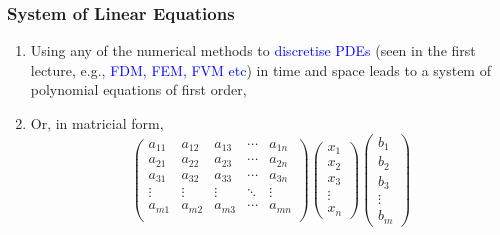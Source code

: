 \documentclass[10pt,compress,handout,ignorenonframetext]{beamer}
\begin{document}
\begin{frame}
 \frametitle{System of Linear Equations} 
\begin{enumerate}
  \item <1-> Using any of the numerical methods to \textcolor{blue}{discretise PDEs} (seen in the first lecture, e.g., \textcolor{blue}{FDM, FEM, FVM etc}) in time and space leads to a system of polynomial equations of first order, 
\item <3-> Or, in matricial form,
\begin{equation}
\begin{pmatrix}
a_{11} & a_{12} & a_{13} & \cdots & a_{1n} \\
a_{21} & a_{22} & a_{23} & \cdots & a_{2n} \\
a_{31} & a_{32} & a_{33} & \cdots & a_{3n} \\
\vdots& \vdots & \vdots& \ddots & \vdots \\
a_{m1} & a_{m2} & a_{m3} & \cdots & a_{mn} \\
\end{pmatrix}
\begin{pmatrix}
x_{1} \\ x_{2} \\ x_{3} \\ \vdots \\ x_{n}
\end{pmatrix}
\begin{pmatrix}
b_{1} \\ b_{2} \\ b_{3} \\ \vdots \\ b_{m}
\end{pmatrix}\label{linalg:matform} 
\end{equation}

\end{enumerate}   
 
\end{frame}
\end{document}
